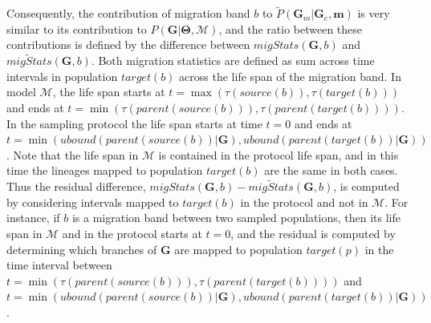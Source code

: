 \documentclass[11pt]{article}
\newcommand{\vect}[1]{\boldsymbol{\mathbf{#1}}}
\newcommand{\M}{\mathcal{M}}
\newcommand{\G}{\vect{G}}
\newcommand{\T}{\vect{\Theta}}
\newcommand{\Pref}{\widetilde{P}}
\newcommand{\1}{\mathbbm{1}}
\newcommand{\Gc}{\G_c}
\newcommand{\Gm}{\G_m}
\newcommand{\migs}{\vect{m}}
\begin{document}
Consequently, the contribution of migration band $b$ to $\Pref(\Gm|\Gc,\migs)$ is very similar to its contribution to $P(\G|\T,\M)$, and the ratio
between these contributions is defined by the difference between $migStats(\G,b)$ and $\widetilde{migStats}(\G,b)$.
Both migration statistics are defined as sum across time intervals in population $target(b)$ across the life span of the migration band.
In model $\M$, the life span starts at $t=\max(\tau(source(b)),\tau(target(b)))$ and ends at $t=\min(\tau(parent(source(b))),\tau(parent(target(b))))$.
In the sampling protocol the life span starts at time $t=0$ and ends at $t=\min(ubound(parent(source(b))|\G),ubound(parent(target(b))|\G))$.
Note that the life span in $\M$ is contained in the protocol life span, and in this time the lineages mapped to population $target(b)$ are the same in both cases.
Thus the residual difference, $migStats(\G,b)-\widetilde{migStats}(\G,b)$, is computed by considering intervals mapped to $target(b)$ in the protocol and not in $\M$.
For instance, if $b$ is a migration band between two sampled populations, then its life span in $\M$ and in the protocol starts at $t=0$, and the residual is computed by 
determining which branches of $\G$ are mapped to population $target(p)$ in the time interval between $t=\min(\tau(parent(source(b))),\tau(parent(target(b))))$ and
$t=\min(ubound(parent(source(b))|\G),ubound(parent(target(b))|\G))$.
\end{document}
